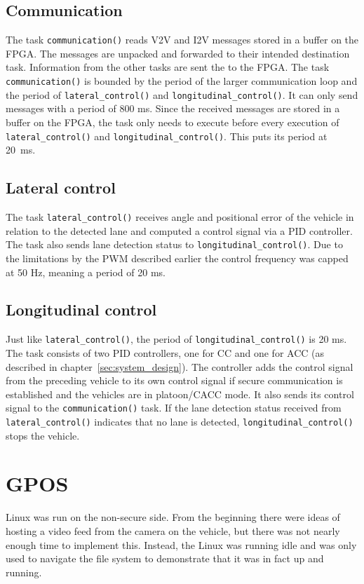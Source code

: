 \subsection{Communication}
The task \texttt{communication()} reads V2V and I2V messages stored in a buffer on the FPGA. The messages are unpacked and forwarded to their intended destination task. Information from the other tasks are sent the to the FPGA. The task \texttt{communication()} is bounded by the period of the larger communication loop and the period of \texttt{lateral\_control()} and \texttt{longitudinal\_control()}. It can only send messages with a period of 800 ms. Since the received messages are stored in a buffer on the FPGA, the task only needs to execute before every execution of \texttt{lateral\_control()} and \texttt{longitudinal\_control()}. This puts its period at 20~ms.

\subsection{Lateral control}
The task \texttt{lateral\_control()} receives angle and positional error of the vehicle in relation to the detected lane and computed a control signal via a PID controller. The task also sends lane detection status to \texttt{longitudinal\_control()}. Due to the limitations by the PWM described earlier the control frequency was capped at 50 Hz, meaning a period of 20 ms.

\subsection{Longitudinal control}
Just like \texttt{lateral\_control()}, the period of \texttt{longitudinal\_control()} is 20 ms. The task consists of two PID controllers, one for CC and one for ACC (as described in chapter~\ref{sec:system_design}). The controller adds the control signal from the preceding vehicle to its own control signal if secure communication is established and the vehicles are in platoon/CACC mode. It also sends its control signal to the \texttt{communication()} task. If the lane detection status received from \texttt{lateral\_control()} indicates that no lane is detected, \texttt{longitudinal\_control()} stops the vehicle.

\section{GPOS}
Linux was run on the non-secure side. From the beginning there were ideas of hosting a video feed from the camera on the vehicle, but there was not nearly enough time to implement this. Instead, the Linux was running idle and was only used to navigate the file system to demonstrate that it was in fact up and running. 

